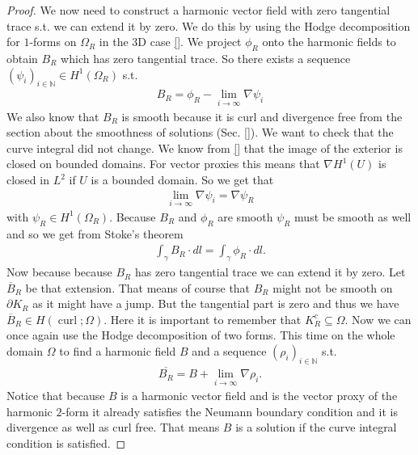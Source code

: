 \documentclass[12pt,a4paper]{article}
\numberwithin{equation}{subsection}
\numberwithin{lemma}{subsection}
\theoremstyle{definition}
\DeclareMathOperator{\curl}{curl}
\newcommand{\naturalnum}{\mathbb{N}}
\begin{document}
\begin{proof}
    We now need to construct a harmonic vector field with zero tangential trace
    s.t. we can extend it by zero. We do this by using the Hodge 
    decomposition for $1$-forms on $\Omega_R$ in the $3$D case \ref{}.
    We project $\phi_R$ onto the harmonic fields to obtain $B_R$ which has zero 
    tangential trace. So there exists a sequence 
    $(\psi_i)_{i \in \naturalnum} \in H^1(\Omega_R)$ s.t.
    \begin{align*}
        B_R = \phi_R - \lim\limits_{i\rightarrow \infty}\nabla \psi_i
    \end{align*}
    We also know that $B_R$ is smooth because 
    it is curl and divergence free from the section about the 
    smoothness of solutions (Sec. \ref{}). We want to check that the curve
    integral did not change. We know from \ref{} that the 
    image of the exterior is closed on bounded domains. For vector proxies this
    means that $\nabla H^1(U)$ is closed in $L^2$ if $U$ is a bounded domain. 
    So we get that 
    \begin{align*}
        \lim\limits_{i\rightarrow \infty}\nabla \psi_i = \nabla \psi_R
    \end{align*}
    with $\psi_R \in H^1(\Omega_R)$. Because $B_R$ and $\phi_R$ are smooth
    $\psi_R$ must be smooth as well and so we get from Stoke's theorem 
    \begin{align*}
        \int_\gamma B_R\cdot dl = \int_\gamma \phi_R\cdot dl.
    \end{align*}
    Now because because $B_R$ has zero tangential trace we can extend it by 
    zero. Let $\overline{B}_R$ be that extension. 
    That means of course that $B_R$ might not be smooth on $\partial K_R$ 
    as it might have a jump. But the tangential part is zero and thus 
    we have $\overline{B}_R \in H(\curl;\Omega)$. 
    Here it is important to remember 
    that $K^c_R \subseteq \Omega$. Now we can once again use the Hodge 
    decomposition of two forms. This time on the whole domain $\Omega$ to find 
    a harmonic field $B$ and a sequence $(\rho_i)_{i\in \naturalnum}$
    s.t.
    \begin{align*}
        \overline{B_R} = B 
            +\lim\limits_{i\rightarrow \infty}\nabla \rho_i.
    \end{align*}
    Notice that because $B$ is a harmonic vector field 
    and is the vector proxy of the harmonic $2$-form it already satisfies 
    the Neumann boundary condition and it is divergence as well as curl free.
    That means $B$ is a solution if the curve integral condition is satisfied.

\end{proof}
\end{document}
